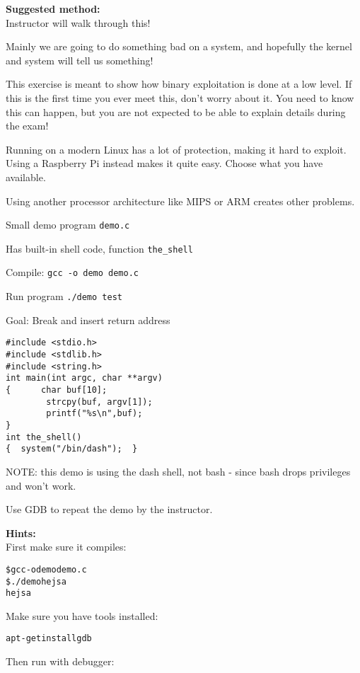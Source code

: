 \documentclass[a4paper,11pt,notitlepage]{report}
\begin{document}
{\bf Suggested method:}\\
Instructor will walk through this!

{\Large
Mainly we are going to do something bad on a system, and hopefully the kernel and system will tell us something!

This exercise is meant to show how binary exploitation is done at a low level. If this is the first time you ever meet this, don't worry about it. You need to know this can happen, but you are not expected to be able to explain details during the exam!}

Running on a modern Linux has a lot of protection, making it hard to exploit. Using a Raspberry Pi instead makes it quite easy. Choose what you have available.

Using another processor architecture like MIPS or ARM creates other problems.

\begin{list2}
\item Small demo program \verb+demo.c+
\item Has built-in shell code, function \verb+the_shell+
\item Compile:
\verb+gcc -o demo demo.c+
\item Run program
\verb+./demo test+
\item Goal: Break and insert return address
\end{list2}

\begin{verbatim}
#include <stdio.h>
#include <stdlib.h>
#include <string.h>
int main(int argc, char **argv)
{      char buf[10];
        strcpy(buf, argv[1]);
        printf("%s\n",buf);
}
int the_shell()
{  system("/bin/dash");  }
\end{verbatim}

NOTE: this demo is using the dash shell, not bash - since bash drops privileges and won't work.

Use GDB to repeat the demo by the instructor.

{\bf Hints:}\\
First make sure it compiles:
\begin{alltt}
\$ gcc -o demo demo.c
\$ ./demo hejsa
hejsa
\end{alltt}

Make sure you have tools installed:
\begin{alltt}
apt-get install gdb
\end{alltt}

Then run with debugger:
\end{document}
